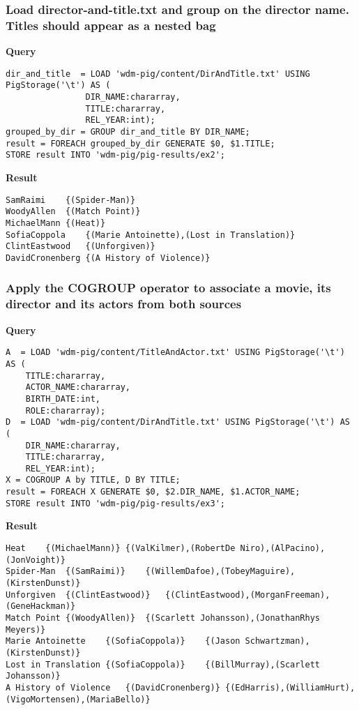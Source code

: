 \documentclass[a4paper,10pt]{article}
\begin{document}
\subsubsection{Load director-and-title.txt and group on the director name. Titles should appear as
a nested bag}
\textbf{Query}
\begin{lstlisting}
dir_and_title  = LOAD 'wdm-pig/content/DirAndTitle.txt' USING PigStorage('\t') AS ( 
                DIR_NAME:chararray,
                TITLE:chararray,
                REL_YEAR:int);
grouped_by_dir = GROUP dir_and_title BY DIR_NAME;
result = FOREACH grouped_by_dir GENERATE $0, $1.TITLE;
STORE result INTO 'wdm-pig/pig-results/ex2';
\end{lstlisting}

\textbf{Result}

\begin{lstlisting}
SamRaimi	{(Spider-Man)}
WoodyAllen	{(Match Point)}
MichaelMann	{(Heat)}
SofiaCoppola	{(Marie Antoinette),(Lost in Translation)}
ClintEastwood	{(Unforgiven)}
DavidCronenberg	{(A History of Violence)}
\end{lstlisting}


\subsubsection{Apply the COGROUP operator to associate a movie, its director and its actors from both sources}
\textbf{Query}
\begin{lstlisting}
A  = LOAD 'wdm-pig/content/TitleAndActor.txt' USING PigStorage('\t') AS ( 
    TITLE:chararray,
    ACTOR_NAME:chararray,
    BIRTH_DATE:int,
    ROLE:chararray);
D  = LOAD 'wdm-pig/content/DirAndTitle.txt' USING PigStorage('\t') AS ( 
    DIR_NAME:chararray,
    TITLE:chararray,
    REL_YEAR:int);
X = COGROUP A by TITLE, D BY TITLE;
result = FOREACH X GENERATE $0, $2.DIR_NAME, $1.ACTOR_NAME;
STORE result INTO 'wdm-pig/pig-results/ex3';
\end{lstlisting}

\textbf{Result}
\begin{lstlisting}
Heat	{(MichaelMann)}	{(ValKilmer),(RobertDe Niro),(AlPacino),(JonVoight)}
Spider-Man	{(SamRaimi)}	{(WillemDafoe),(TobeyMaguire),(KirstenDunst)}
Unforgiven	{(ClintEastwood)}	{(ClintEastwood),(MorganFreeman),(GeneHackman)}
Match Point	{(WoodyAllen)}	{(Scarlett Johansson),(JonathanRhys Meyers)}
Marie Antoinette	{(SofiaCoppola)}	{(Jason Schwartzman),(KirstenDunst)}
Lost in Translation	{(SofiaCoppola)}	{(BillMurray),(Scarlett Johansson)}
A History of Violence	{(DavidCronenberg)}	{(EdHarris),(WilliamHurt),(VigoMortensen),(MariaBello)}
\end{lstlisting}
\end{document}
